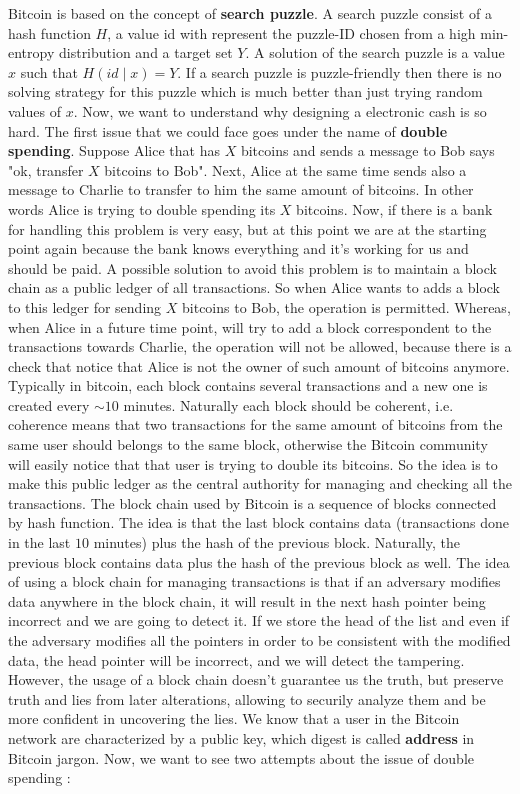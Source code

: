 Bitcoin is based on the concept of \textbf{search puzzle}. A search puzzle consist of a hash function $H$, a value id with represent the puzzle-ID chosen from a high min-entropy distribution and a target set $Y$. A solution of the search puzzle is a value $x$ such that $H(id \mid x) = Y$. If a search puzzle is puzzle-friendly then there is no solving strategy for this puzzle which is much better than just trying random values of $x$. Now, we want to understand why designing a electronic cash is so hard. The first issue that we could face goes under the name of \textbf{double spending}. Suppose Alice that has $X$ bitcoins and sends a message to Bob says "ok, transfer $X$ bitcoins to Bob". Next, Alice at the same time sends also a message to Charlie to transfer to him the same amount of bitcoins. In other words Alice is trying to double spending its $X$ bitcoins. Now, if there is a bank for handling this problem is very easy, but at this point we are at the starting point again because the bank knows everything and it's working for us and should be paid. A possible solution to avoid this problem is to maintain a block chain as a public ledger of all transactions. So when Alice wants to adds a block to this ledger for sending $X$ bitcoins to Bob, the operation is permitted. Whereas, when Alice in a future time point, will try to add a block correspondent to the transactions towards Charlie, the operation will not be allowed, because there is a check that notice that Alice is not the owner of such amount of bitcoins anymore. Typically in bitcoin, each block contains several transactions and a new one is created every $\sim 10$ minutes. Naturally each block should be coherent, i.e. coherence means that two transactions for the same amount of bitcoins from the same user should belongs to the same block, otherwise the Bitcoin community will easily notice that that user is trying to double its bitcoins. So the idea is to make this public ledger as the central authority for managing and checking all the transactions. The block chain used by Bitcoin is a sequence of blocks connected by hash function. The idea is that the last block contains data (transactions done in the last $10$ minutes) plus the hash of the previous block. Naturally, the previous block contains data plus the hash of the previous block as well. The idea of using a block chain for managing transactions is that if an adversary modifies data anywhere in the block chain, it will result in the next hash pointer being incorrect and we are going to detect it. If we store the head of the list and even if the adversary modifies all the pointers in order to be consistent with the modified data, the head pointer will be incorrect, and we will detect the tampering. However, the usage of a block chain doesn't guarantee us the truth, but preserve truth and lies from later alterations, allowing to securily analyze them and be more confident in uncovering the lies. We know that a user in the Bitcoin network are characterized by a public key, which digest is called \textbf{address} in Bitcoin jargon. Now, we want to see two attempts about the issue of double spending :

